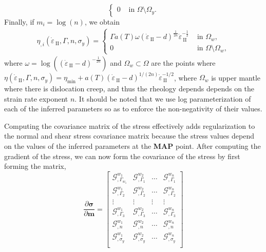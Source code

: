 \documentclass[12pt]{article}
\newcommand{\vrnote}[1]{\textcolor{red}{VR: #1}}
\newcommand{\IIinv}{{\dot\varepsilon}_{\mathrm{\!\!\:II}}}
\newcommand{\mm}{{\ensuremath{\boldsymbol{m}}}}
\newcommand{\ssigma}{{\ensuremath{\boldsymbol{\sigma}}}}
\begin{document}
{\begin{equation*}
\begin{cases}
    0                          & \text{ in } \Omega\setminus\Omega_y.
  \end{cases}
  \end{equation*}
Finally, if $m_i = \log(n)$, we obtain
\begin{align*}
  \eta_{,i}(\IIinv,\Gamma,n,\sigma_y) =
  \begin{cases}
    \Gamma a(T)\omega(\IIinv-d)^{\frac{1}{2n}}\IIinv^{-\frac{1}{2}} &
    \text{ in }\Omega_w,\\
    0 & \text{ in } \Omega\setminus\Omega_w,
  \end{cases}
  \end{align*}
where $\omega = \log((\IIinv-d)^{-\frac{1}{2n}})$ and
$\Omega_w\subset\Omega$ are the points where
$\eta(\IIinv,\Gamma,n,\sigma_y) = \eta_{\min} +
a(T)(\IIinv-d)^{1/(2n)}\IIinv^{-1/2}$, where $\Omega_w$ is upper mantle where there is dislocation creep, and thus the rheology depends depends
on the strain rate exponent $n$. It should be noted that we use log parameterization of each of the inferred parameters so as to enforce the non-negativity of their values. 

Computing the covariance matrix of the stress effectively adds regularization to the normal and shear stress covariance matrix because the stress values depend on the values of the inferred parameters at the \textbf{MAP} point. After computing the gradient of the stress, we can now form the covariance of the stress by first forming the matrix,
\begin{equation}
\frac{\partial \ssigma}{\partial \mm}=
  \begin{bmatrix}
    \mathcal G^{w_1}_{,\Gamma_{w_1}}  & \mathcal G^{w_2}_{,\Gamma_{1}} & \hdots & \mathcal G^{w_n}_{,\Gamma_{1}} \\
    \mathcal G^{w_1}_{,\Gamma_{2}} & \mathcal G^{w_2}_{,\Gamma_{2}}  &  \hdots & \mathcal G^{w_n}_{,\Gamma_{2}} \\
    \vdots & \vdots & \vdots & \vdots  \\
    \mathcal G^{w_1}_{,\Gamma_{3}} & \mathcal G^{w_2}_{,\Gamma_{3}} &   \hdots & \mathcal G^{w_n}_{,\Gamma_{3}} \\
    \mathcal G^{w_1}_{,n} & \mathcal G^{w_2}_{,n} &  \hdots & \mathcal G^{w_n}_{,n} \\
    \mathcal G^{w_1}_{,\sigma_y} & \mathcal G^{w_2}_{,\sigma_y} &  \hdots & \mathcal G^{w_n}_{,\sigma_y} \\


\end{bmatrix}
\end{equation}}
\end{document}
